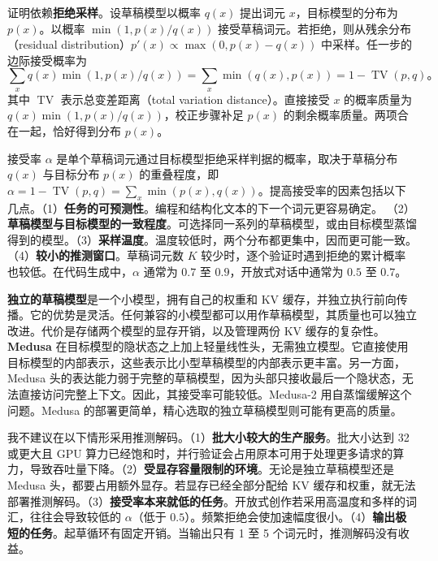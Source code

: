 \begin{interview}
证明依赖\textbf{拒绝采样}。设草稿模型以概率 \(q(x)\) 提出词元 \(x\)，目标模型的分布为 \(p(x)\)。以概率 \(\min(1,p(x)/q(x))\) 接受草稿词元。若拒绝，则从残余分布（residual distribution）\(p'(x)\propto\max(0,p(x)-q(x))\) 中采样。任一步的边际接受概率为
\[
  \sum_x q(x)\min(1,p(x)/q(x))=\sum_x\min(q(x),p(x))=1-\operatorname{TV}(p,q)\text{。}
\]
其中 \(\operatorname{TV}\) 表示总变差距离（total variation distance）。直接接受 \(x\) 的概率质量为 \(q(x)\min(1,p(x)/q(x))\)，校正步骤补足 \(p(x)\) 的剩余概率质量。两项合在一起，恰好得到分布 \(p(x)\)。

接受率 \(\alpha\) 是单个草稿词元通过目标模型拒绝采样判据的概率，取决于草稿分布 \(q(x)\) 与目标分布 \(p(x)\) 的重叠程度，即 \(\alpha=1-\operatorname{TV}(p,q)=\sum_x\min(p(x),q(x))\)。提高接受率的因素包括以下几点。（1）\textbf{任务的可预测性}。编程和结构化文本的下一个词元更容易确定。
（2）\textbf{草稿模型与目标模型的一致程度}。可选择同一系列的草稿模型，或由目标模型蒸馏得到的模型。（3）\textbf{采样温度}。温度较低时，两个分布都更集中，因而更可能一致。（4）\textbf{较小的推测窗口}。草稿词元数 \(K\) 较少时，逐个验证时遇到拒绝的累计概率也较低。在代码生成中，\(\alpha\) 通常为 \(0.7\) 至 \(0.9\)，开放式对话中通常为 \(0.5\) 至 \(0.7\)。

\textbf{独立的草稿模型}是一个小模型，拥有自己的权重和 KV 缓存，并独立执行前向传播。它的优势是灵活。任何兼容的小模型都可以用作草稿模型，其质量也可以独立改进。代价是存储两个模型的显存开销，以及管理两份 KV 缓存的复杂性。\textbf{Medusa} 在目标模型的隐状态之上加上轻量线性头，无需独立模型。它直接使用目标模型的内部表示，这些表示比小型草稿模型的内部表示更丰富。另一方面，Medusa 头的表达能力弱于完整的草稿模型，因为头部只接收最后一个隐状态，无法直接访问完整上下文。因此，其接受率可能较低。Medusa-2 用自蒸馏缓解这个问题。Medusa 的部署更简单，精心选取的独立草稿模型则可能有更高的质量。

我不建议在以下情形采用推测解码。（1）\textbf{批大小较大的生产服务}。批大小达到 32 或更大且 GPU 算力已经饱和时，并行验证会占用原本可用于处理更多请求的算力，导致吞吐量下降。（2）\textbf{受显存容量限制的环境}。无论是独立草稿模型还是 Medusa 头，都要占用额外显存。若显存已经全部分配给 KV 缓存和权重，就无法部署推测解码。（3）\textbf{接受率本来就低的任务}。开放式创作若采用高温度和多样的词汇，往往会导致较低的 \(\alpha\)（低于 \(0.5\)）。频繁拒绝会使加速幅度很小。（4）\textbf{输出极短的任务}。起草循环有固定开销。当输出只有 1 至 5 个词元时，推测解码没有收益。


\end{interview}
